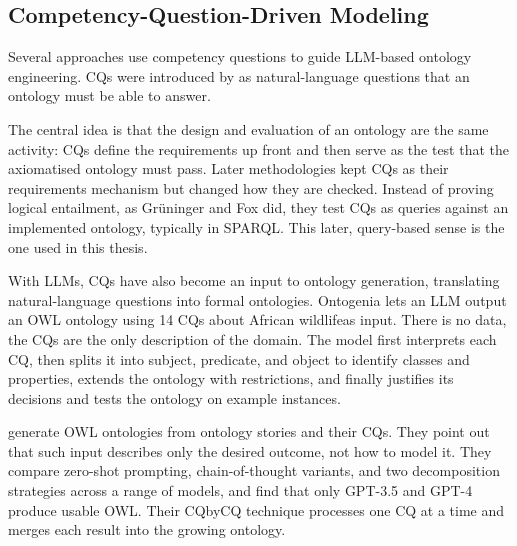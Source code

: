 
\subsection{Competency-Question-Driven Modeling}\label{sec:rw-cqwork}
Several approaches use competency questions to guide LLM-based ontology engineering. CQs were introduced by \citet{gruninger1995methodology} as natural-language questions that an ontology must be able to answer. 

The central idea is that the design and evaluation of an ontology are the same activity: CQs define the requirements up front and then serve as the test that the axiomatised ontology must pass. Later methodologies kept CQs as their requirements mechanism but changed how they are checked. Instead of proving logical entailment, as Grüninger and Fox did, they test CQs as queries against an implemented ontology, typically in SPARQL\@. This later, query-based sense is the one used in this thesis.

With LLMs, CQs have also become an input to ontology generation, translating natural-language questions into formal ontologies. Ontogenia \citep{lippolis2024ontogenia} lets an LLM output an OWL ontology using 14 CQs about African wildlifeas input. There is no data, the CQs are the only description of the domain. The model first interprets each CQ, then splits it into subject, predicate, and object to identify classes and properties, extends the ontology with restrictions, and finally justifies its decisions and tests the ontology on example instances. 

\citet{saeedizade2024navigating} generate OWL ontologies from ontology stories and their CQs. They point out that such input describes only the desired outcome, not how to model it. They compare zero-shot prompting, chain-of-thought variants, and two decomposition strategies across a range of models, and find that only GPT-3.5 and GPT-4 produce usable OWL\@. Their CQbyCQ technique processes one CQ at a time and merges each result into the growing ontology. 

